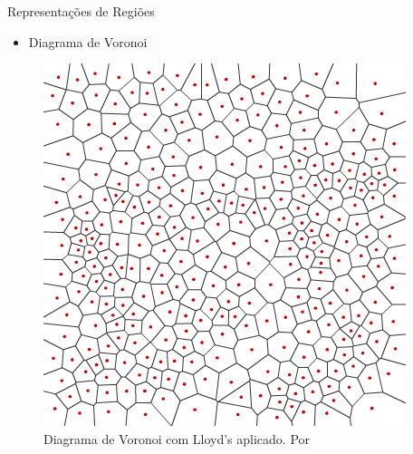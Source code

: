 \begin{frame}{Representações de Regiões}
    \begin{itemize} \setlength\itemsep{1em}
        \item Diagrama de Voronoi
        
    \end{itemize}
    \begin{figure}[H]
        \centering
        \includegraphics[width=.5\textwidth, height=.5\textheight]{img/voronoi-2-lloyd}
        \caption{Diagrama de Voronoi com Lloyd's aplicado. Por \cite{patel2010polygonal}}
        \label{fig:voronoi-2-lloyd}
    \end{figure}
\end{frame}